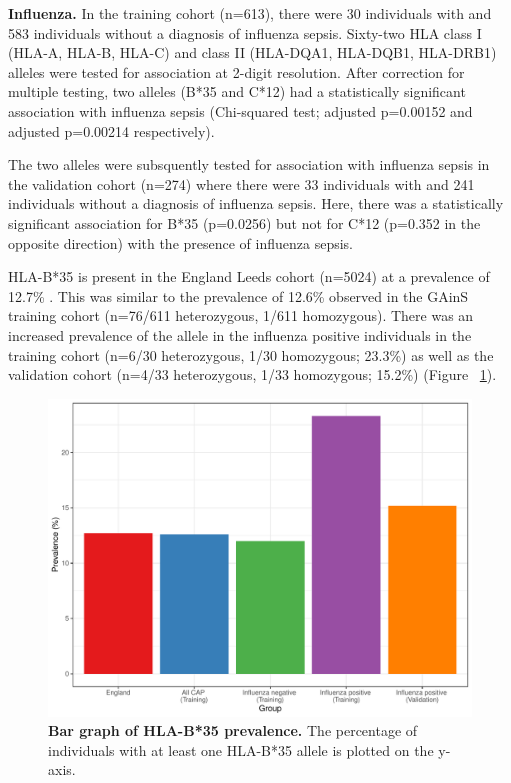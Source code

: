 \textbf{Influenza.} In the training cohort (n=613), there were 30 individuals with and 583 individuals without a diagnosis of influenza sepsis. Sixty-two HLA class I (HLA-A, HLA-B, HLA-C) and class II (HLA-DQA1, HLA-DQB1, HLA-DRB1) alleles were tested for association at 2-digit resolution. After correction for multiple testing, two alleles (B*35 and C*12) had a statistically significant association with influenza sepsis (Chi-squared test; adjusted p=0.00152 and adjusted p=0.00214 respectively). 

The two alleles were subsquently tested for association with influenza sepsis in the validation cohort (n=274) where there were 33 individuals with and 241 individuals without a diagnosis of influenza sepsis. Here, there was a statistically significant association for B*35 (p=0.0256) but not for C*12 (p=0.352 in the opposite direction) with the presence of influenza sepsis. 

HLA-B*35 is present in the England Leeds cohort (n=5024) at a prevalence of 12.7\% \parencite{AlleleFrequencies}. This was similar to the prevalence of 12.6\% observed in the GAinS training cohort (n=76/611 heterozygous, 1/611 homozygous). There was an increased prevalence of the allele in the influenza positive individuals in the training cohort (n=6/30 heterozygous, 1/30 homozygous; 23.3\%) as well as the validation cohort (n=4/33 heterozygous, 1/33 homozygous; 15.2\%) (Figure ~\ref{fig:bar-hla-b35}).

\FloatBarrier
\begin{figure}[htbp]
\centering
\includegraphics[scale=0.5]{./Results3/Images/bar_hla_b35.pdf}
\caption[Bar graph of HLA-B*35 prevalence]{\textbf{Bar graph of HLA-B*35 prevalence.} The percentage of individuals with at least one HLA-B*35 allele is plotted on the y-axis.}
\label{fig:bar-hla-b35}
\end{figure}
\FloatBarrier

